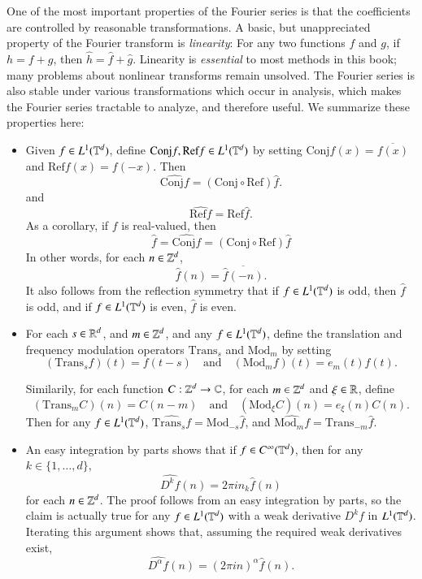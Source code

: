 One of the most important properties of the Fourier series is that the coefficients are controlled by reasonable transformations. A basic, but unappreciated property of the Fourier transform is \emph{linearity}: For any two functions $f$ and $g$, if $h = f + g$, then $\widehat{h} = \widehat{f} + \widehat{g}$. Linearity is \emph{essential} to most methods in this book; many problems about nonlinear transforms remain unsolved. The Fourier series is also stable under various transformations which occur in analysis, which makes the Fourier series tractable to analyze, and therefore useful. We summarize these properties here:
%
\begin{itemize}
    \item Given $f \in L^1(\operatorname{\mathbb{T}}^d)$, define $\text{Conj} f, \text{Ref} f \in L^1(\operatorname{\mathbb{T}}^d)$ by setting $\text{Conj}f(x) = \overline{f(x)}$ and $\text{Ref} f(x) = f(-x)$. Then
    \[ \widehat{\text{Conj} f} = (\text{Conj} \circ \text{Ref}) \widehat{f}. \]
    and
    \[ \widehat{\text{Ref} f} = \text{Ref} \widehat{f}. \]
    As a corollary, if $f$ is real-valued, then
    \[ \widehat{f} = \widehat{\text{Conj} f} = (\text{Conj} \circ \text{Ref}) \widehat{f} \]
    In other words, for each $n \in \operatorname{\mathbb{Z}}^d$,
    \[ \widehat{f}(n) = \overline{\widehat{f}(-n)}. \]
    It also follows from the reflection symmetry that if $f \in L^1(\operatorname{\mathbb{T}}^d)$ is odd, then $\widehat{f}$ is odd, and if $f \in L^1(\operatorname{\mathbb{T}}^d)$ is even, $\widehat{f}$ is even.

    \item For each $s \in \operatorname{\mathbb{R}}^d$, and $m \in \operatorname{\mathbb{Z}}^d$, and any $f \in L^1(\operatorname{\mathbb{T}}^d)$, define the translation and frequency modulation operators $\text{Trans}_s$ and $\text{Mod}_m$ by setting
    \[ (\text{Trans}_s f)(t) = f(t - s) \quad\text{and}\quad (\text{Mod}_m f)(t) = e_m(t) f(t). \]

    Similarily, for each function $C: \operatorname{\mathbb{Z}}^d \to \operatorname{\mathbb{C}}$, for each $m \in \operatorname{\mathbb{Z}}^d$ and $\xi \in \operatorname{\mathbb{R}}$, define
    \[ (\text{Trans}_m C)(n) = C(n - m) \quad\text{and}\quad (\text{Mod}_\xi C)(n) = e_\xi(n) C(n). \]
    Then for any $f \in L^1(\operatorname{\mathbb{T}}^d)$, $\widehat{\text{Trans}_s f} = \text{Mod}_{-s} \widehat{f}$, and $\widehat{\text{Mod}_m f} = \text{Trans}_{-m} \widehat{f}$.

    \item An easy integration by parts shows that if $f \in C^\infty(\operatorname{\mathbb{T}}^d)$, then for any $k \in \{ 1, \dots, d \}$,
    \[ \widehat{D^k f}(n) = 2 \pi i n_k \widehat{f}(n) \]
    for each $n \in \operatorname{\mathbb{Z}}^d$. The proof follows from an easy integration by parts, so the claim is actually true for any $f \in L^1(\operatorname{\mathbb{T}}^d)$ with a weak derivative $D^k f$ in $L^1(\operatorname{\mathbb{T}}^d)$. Iterating this argument shows that, assuming the required weak derivatives exist,
    \[ \widehat{D^\alpha f}(n) = (2 \pi i n)^\alpha \widehat{f}(n). \]
\end{itemize}

